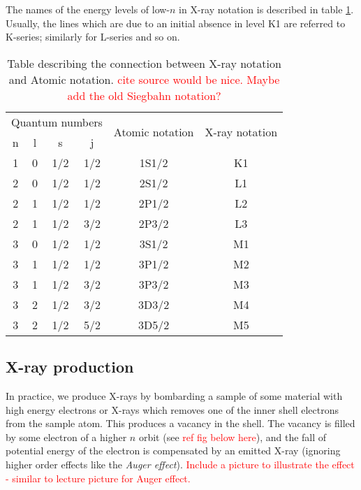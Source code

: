\documentclass[11pt,a4paper,twoside,onecolumn]{article}
\newcommand{\reminder}[1]{\textcolor{red}{#1}}
\begin{document}
The names of the energy levels of low-$n$ in X-ray notation is described in table \ref{tab:x-ray-notation}. Usually, the lines which are due to an initial absence in level K1 are referred to K-series; similarly for L-series and so on.
\begin{table}[!htb]
    \centering
    \begin{tabular}{@{}cccccc@{}}
    \toprule
    \multicolumn{4}{l}{Quantum numbers} & \multirow{2}{*}{Atomic notation} & \multirow{2}{*}{X-ray notation} \\ \cmidrule(r){1-4}
    n      & l      & s       & j       &                                  &                                 \\ \midrule
    1      & 0      & 1/2     & 1/2     & 1S1/2                            & K1                              \\
    2      & 0      & 1/2     & 1/2     & 2S1/2                            & L1                              \\
    2      & 1      & 1/2     & 1/2     & 2P1/2                            & L2                              \\
    2      & 1      & 1/2     & 3/2     & 2P3/2                            & L3                              \\
    3      & 0      & 1/2     & 1/2     & 3S1/2                            & M1                              \\
    3      & 1      & 1/2     & 1/2     & 3P1/2                            & M2                              \\
    3      & 1      & 1/2     & 3/2     & 3P3/2                            & M3                              \\
    3      & 2      & 1/2     & 3/2     & 3D3/2                            & M4                              \\
    3      & 2      & 1/2     & 5/2     & 3D5/2                            & M5                              \\ \bottomrule
    \end{tabular}
    \caption{Table describing the connection between X-ray notation and Atomic notation. \reminder{cite source would be nice. Maybe add the old Siegbahn notation?}}
    \label{tab:x-ray-notation}
\end{table}

\subsection{X-ray production}
In practice, we produce X-rays by bombarding a sample of some material with high energy electrons or X-rays which removes one of the inner shell electrons from the sample atom. This produces a vacancy in the shell. The vacancy is filled by some electron of a higher $n$ orbit (see \reminder{ref fig below here}), and the fall of potential energy of the electron is compensated by an emitted X-ray (ignoring higher order effects like the \emph{Auger effect}).
\reminder{Include a picture to illustrate the effect - similar to lecture picture for Auger effect.}
\end{document}
